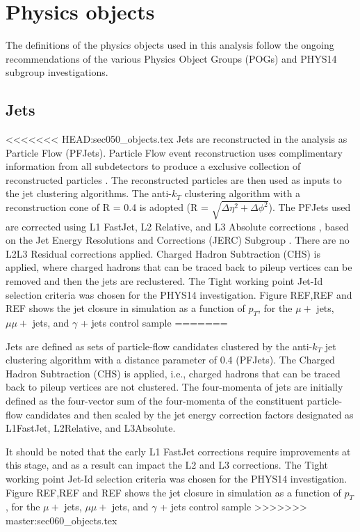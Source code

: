 \section{Physics objects}
\label{sec:objects}
The definitions of the physics objects used in this analysis follow the ongoing recommendations of the various Physics Object Groups (POGs) and PHYS14 subgroup investigations. 

\subsection{Jets}
<<<<<<< HEAD:sec050_objects.tex
\label{sec:jetreco}
Jets are reconstructed in the analysis as Particle Flow (PFJets). Particle Flow event reconstruction uses complimentary information from all subdetectors to produce a exclusive collection of reconstructed particles \cite{CMS-PAS-PFT-10-001}. The reconstructed particles are then used as inputs to the jet clustering algorithms. The anti-$k_{T}$ clustering algorithm with a reconstruction cone of R = 0.4 is adopted (R = $\sqrt{\Delta \eta^{2} + \Delta \phi^{2}   }$). The PFJets used are corrected using L1 FastJet, L2 Relative, and L3 Absolute corrections \cite{Jet-energy-scale}, based on the Jet Energy Resolutions and Corrections (JERC) Subgroup \cite{CMS-PAS-JME-10-003}. There are no L2L3 Residual corrections applied. Charged Hadron Subtraction (CHS) is applied, where charged hadrons that can be traced back to pileup vertices can be removed and then the jets are reclustered. 
The Tight working point Jet-Id selection criteria was chosen for the PHYS14 investigation. Figure REF,REF and REF shows the jet closure in simulation as a function of $p_{T}$, for the $\mu +$ jets, $\mu\mu +$ jets, and $\gamma$ + jets control sample
=======

Jets are defined as sets of particle-flow candidates clustered by the
anti-$k_{T}$ jet clustering algorithm with a distance parameter of 0.4
(PFJets). The Charged Hadron Subtraction (CHS) is applied, i.e., charged
hadrons that can be traced back to pileup vertices are not clustered.
The four-momenta of jets are initially defined as the four-vector sum of
the four-momenta of the constituent particle-flow candidates and then
scaled by the jet energy correction factors designated as L1FastJet,
L2Relative, and L3Absolute.

It should be noted that the early L1 FastJet corrections require
improvements at this stage, and as a result can impact the L2 and L3
corrections. The Tight working point Jet-Id selection criteria was
chosen for the PHYS14 investigation. Figure REF,REF and REF shows the
jet closure in simulation as a function of $p_{T}$, for the $\mu +$
jets, $\mu\mu +$ jets, and $\gamma$ + jets control sample
>>>>>>> master:sec060_objects.tex

